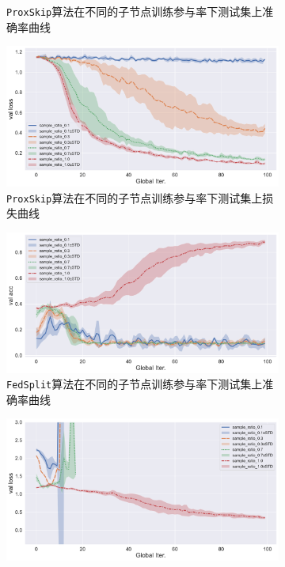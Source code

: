 \begin{figure}[H]
\begin{subfigure}{.5\textwidth}
  \caption{\texttt{ProxSkip}算法在不同的子节点训练参与率下测试集上准确率曲线}
  \label{fig:proxskip-compare-sample-ratio-val-acc}
\end{subfigure}%
\begin{subfigure}{.5\textwidth}
  \centering
  \includegraphics[width=.95\linewidth]{figures/proxskip-compare-sample-ratio-val-loss.pdf}
  \caption{\texttt{ProxSkip}算法在不同的子节点训练参与率下测试集上损失曲线}
  \label{fig:proxskip-compare-sample-ratio-val-loss}
\end{subfigure}
\begin{subfigure}{.5\textwidth}
  \centering
  \includegraphics[width=.95\linewidth]{figures/fedsplit-compare-sample-ratio-val-acc.pdf}
  \caption{\texttt{FedSplit}算法在不同的子节点训练参与率下测试集上准确率曲线}
  \label{fig:fedsplit-compare-sample-ratio-val-acc}
\end{subfigure}%
\begin{subfigure}{.5\textwidth}
  \centering
  \includegraphics[width=.95\linewidth]{figures/fedsplit-compare-sample-ratio-val-loss.pdf}

\end{subfigure}
\end{figure}
